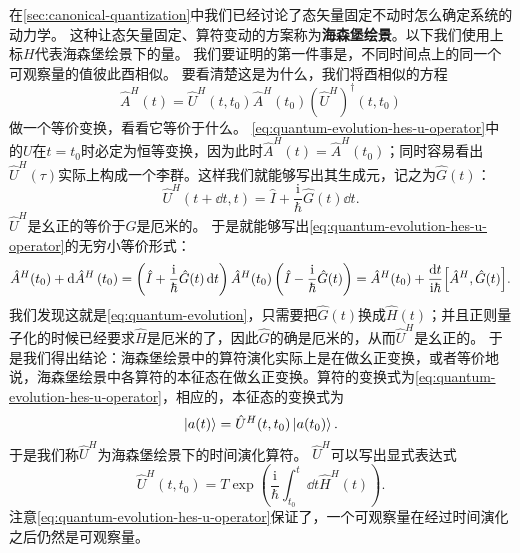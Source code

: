\documentclass[UTF8, a4paper]{ctexart}
\newcommand*{\ii}{\mathrm{i}}
\begin{document}
在\autoref{sec:canonical-quantization}中我们已经讨论了态矢量固定不动时怎么确定系统的动力学。
这种让态矢量固定、算符变动的方案称为\textbf{海森堡绘景}。以下我们使用上标$H$代表海森堡绘景下的量。
我们要证明的第一件事是，不同时间点上的同一个可观察量的值彼此酉相似。
要看清楚这是为什么，我们将酉相似的方程
\begin{equation}
    \hat{A}^H (t) = \hat{U}^H(t, t_0) \hat{A}^H (t_0) (\hat{U}^H)^\dagger(t, t_0)
    \label{eq:quantum-evolution-hes-u-operator}
\end{equation}
做一个等价变换，看看它等价于什么。%
\eqref{eq:quantum-evolution-hes-u-operator}中的$U$在$t=t_0$时必定为恒等变换，因为此时$\hat{A}^H (t) = \hat{A}^H (t_0)$；同时容易看出$\hat{U}^H(\tau)$实际上构成一个李群。这样我们就能够写出其生成元，记之为$\hat{G}(t)$：
\[
    \hat{U}^H(t+\dd{t}, t) = \hat{I} + \frac{\ii}{\hbar} \hat{G}(t) \dd{t}.
\]
$\hat{U}^H$是幺正的等价于$\hat{G}$是厄米的。
于是就能够写出\eqref{eq:quantum-evolution-hes-u-operator}的无穷小等价形式：
\[
    \hat{A}^H (t_0) + \dd{\hat{A}^H}(t_0) = \left( \hat{I} + \frac{\ii}{\hbar} \hat{G}(t) \dd{t} \right) \hat{A}^H (t_0) \left( \hat{I} - \frac{\ii}{\hbar} \hat{G}(t) \right) = \hat{A}^H (t_0) + \frac{\dd{t}}{\ii \hbar} \comm{\hat{A}^H}{\hat{G}(t)}.
\]
我们发现这就是\eqref{eq:quantum-evolution}，只需要把$\hat{G}(t)$换成$\hat{H}(t)$；并且正则量子化的时候已经要求$\hat{H}$是厄米的了，因此$\hat{G}$的确是厄米的，从而$\hat{U}^H$是幺正的。
于是我们得出结论：海森堡绘景中的算符演化实际上是在做幺正变换，或者等价地说，海森堡绘景中各算符的本征态在做幺正变换。算符的变换式为\eqref{eq:quantum-evolution-hes-u-operator}，相应的，本征态的变换式为
\begin{equation}
    \ket{a(t)} = \hat{U}^H(t, t_0) \ket{a(t_0)}.
\end{equation}
于是我们称$\hat{U}^H$为海森堡绘景下的时间演化算符。
$\hat{U}^H$可以写出显式表达式
\begin{equation}
    \hat{U}^H(t, t_0) = T \exp \left( \frac{\ii}{\hbar} \int_{t_0}^t \dd{t} \hat{H}^H (t) \right).
\end{equation}
注意\eqref{eq:quantum-evolution-hes-u-operator}保证了，一个可观察量在经过时间演化之后仍然是可观察量。
\end{document}
